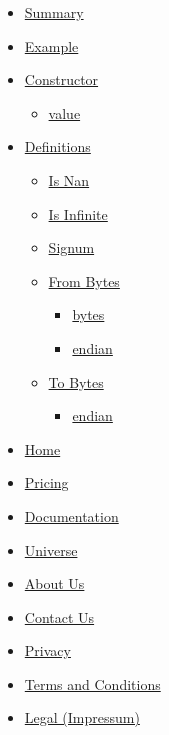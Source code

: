 \begin{itemize}
\tightlist
\item
  \hyperref[summary]{Summary}
\item
  \hyperref[example]{Example}
\item
  \hyperref[constructor]{Constructor}

  \begin{itemize}
  \tightlist
  \item
    \hyperref[constructor-value]{value}
  \end{itemize}
\item
  \hyperref[definitions]{Definitions}

  \begin{itemize}
  \tightlist
  \item
    \hyperref[definitions-is-nan]{Is Nan}
  \item
    \hyperref[definitions-is-infinite]{Is Infinite}
  \item
    \hyperref[definitions-signum]{Signum}
  \item
    \hyperref[definitions-from-bytes]{From Bytes}

    \begin{itemize}
    \tightlist
    \item
      \hyperref[definitions-from-bytes-bytes]{bytes}
    \item
      \hyperref[definitions-from-bytes-endian]{endian}
    \end{itemize}
  \item
    \hyperref[definitions-to-bytes]{To Bytes}

    \begin{itemize}
    \tightlist
    \item
      \hyperref[definitions-to-bytes-endian]{endian}
    \end{itemize}
  \end{itemize}
\end{itemize}

\begin{itemize}
\tightlist
\item
  \href{/}{Home}
\item
  \href{/pricing/}{Pricing}
\item
  \href{/docs/}{Documentation}
\item
  \href{/universe/}{Universe}
\item
  \href{/about/}{About Us}
\item
  \href{/contact/}{Contact Us}
\item
  \href{/privacy/}{Privacy}
\item
  \href{https://typst.app/terms}{Terms and Conditions}
\item
  \href{/legal/}{Legal (Impressum)}
\end{itemize}

